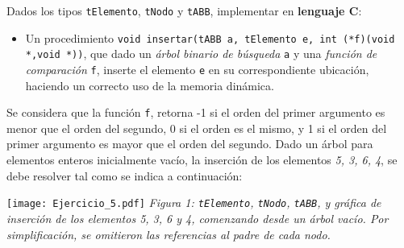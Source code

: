 \documentclass[12pt,a4paper]{article}
\begin{document}
 Dados los tipos \texttt{tElemento}, \texttt{tNodo} y \texttt{tABB}, implementar en \textbf{lenguaje C}: 
\begin{itemize}
	\item Un procedimiento \texttt{void insertar(tABB a, tElemento e, int (*f)(void *,void *))}, que dado un \textit{árbol binario de búsqueda} \texttt{a} y una \textit{función de comparación} \texttt{f}, inserte el elemento \texttt{e} en su correspondiente ubicación, haciendo un correcto uso de la memoria dinámica. 
\end{itemize}

Se considera que la función \texttt{f}, retorna -1 si el orden del primer argumento es menor que el orden del segundo, 0 si el orden es el mismo, y 1 si el orden del primer argumento es mayor que el orden del segundo. Dado un árbol para elementos enteros inicialmente vacío, la inserción de los elementos \textit{5, 3, 6, 4}, se debe resolver tal como se indica a continuación: \\
\begin{center}
	\texttt{[image: Ejercicio\_5.pdf]}
	\textit{Figura 1: \texttt{tElemento}, \texttt{tNodo}, \texttt{tABB}, y gráfica de inserción de los elementos 5, 3, 6 y 4, comenzando desde un árbol vacío. Por simplificación, se omitieron las referencias al padre de cada nodo.}
\end{center}
\end{document}
